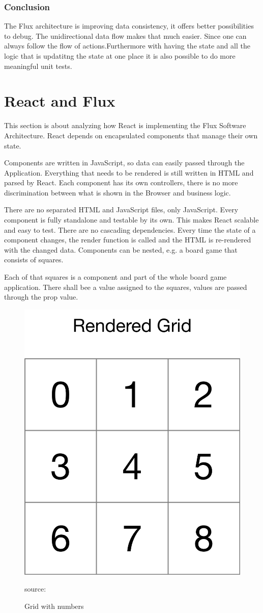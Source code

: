 \subsubsection{Conclusion}
The Flux architecture is improving data consistency, it offers better possibilities to debug. The unidirectional data flow makes that much easier. Since one can always follow the flow of actions.Furthermore with having the state and all the logic that is updatitng the state at one place  it is also possible to do more meaningful unit tests.

\section{React and Flux}
This section is about analyzing how React is implementing the Flux Software Architecture. React depends on encapsulated components that manage their own state. 

Components are written in JavaScript, so data can easily passed through the Application. Everything that needs to be rendered is still written in HTML and parsed by React. Each component has its own controllers, there is no more discrimination between what is shown in the Browser and business logic.

There are no separated HTML and JavaScript files, only JavaScript. Every component is fully standalone and testable by its own. This makes React scalable and easy to test. There are no cascading dependencies. Every time the state of a component changes, the render function is called and the HTML is re-rendered with the changed data. Components can be nested, e.g. a board game that consists of squares.




Each of that squares is a component and part of the whole board game application. There shall bee a value assigned to the squares, values are passed through the prop value.




\begin{figure}[H]
	\centering
	\includegraphics[width=0.3\linewidth]{bilder/grundlagen/GameGrid.png}
	\caption{Grid with numbers} source:\cite{ReactLogo}
	\label{fig:RL}
\end{figure}

